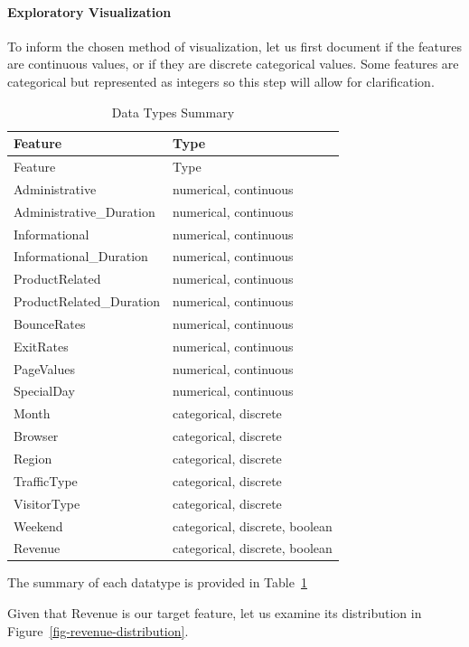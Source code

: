 \documentclass[
  letterpaper,
  DIV=11,
  numbers=noendperiod]{scrartcl}
\let\oldparagraph\paragraph
\renewcommand{\paragraph}[1]{\oldparagraph{#1}\mbox{}}
\begin{document}
\paragraph{Exploratory Visualization}\label{exploratory-visualization}

To inform the chosen method of visualization, let us first document if
the features are continuous values, or if they are discrete categorical
values. Some features are categorical but represented as integers so
this step will allow for clarification.

\begin{longtable}[]{@{}ll@{}}
\caption{Data Types Summary}\label{tbl-features}\tabularnewline
\toprule\noalign{}
Feature & Type \\
\midrule\noalign{}
\endfirsthead
\toprule\noalign{}
Feature & Type \\
\midrule\noalign{}
\endhead
\bottomrule\noalign{}
\endlastfoot
Administrative & numerical, continuous \\
Administrative\_Duration & numerical, continuous \\
Informational & numerical, continuous \\
Informational\_Duration & numerical, continuous \\
ProductRelated & numerical, continuous \\
ProductRelated\_Duration & numerical, continuous \\
BounceRates & numerical, continuous \\
ExitRates & numerical, continuous \\
PageValues & numerical, continuous \\
SpecialDay & numerical, continuous \\
Month & categorical, discrete \\
Browser & categorical, discrete \\
Region & categorical, discrete \\
TrafficType & categorical, discrete \\
VisitorType & categorical, discrete \\
Weekend & categorical, discrete, boolean \\
Revenue & categorical, discrete, boolean \\
\end{longtable}

The summary of each datatype is provided in Table~\ref{tbl-features}

Given that Revenue is our target feature, let us examine its
distribution in Figure~\ref{fig-revenue-distribution}.
\end{document}
